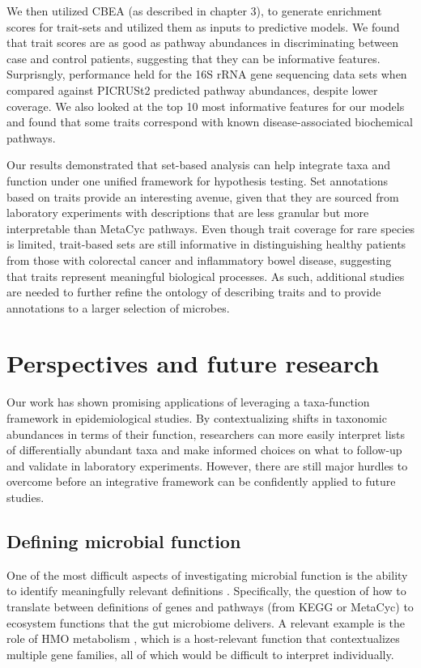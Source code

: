 We then utilized CBEA (as described in chapter 3), to generate enrichment scores for trait-sets and utilized them as inputs to predictive models. We found that trait scores are as good as pathway abundances in discriminating between case and control patients, suggesting that they can be informative features. Surprisngly, performance held for the 16S rRNA gene sequencing data sets when compared against PICRUSt2 predicted pathway abundances, despite lower coverage. We also looked at the top 10 most informative features for our models and found that some traits correspond with known disease-associated biochemical pathways.  

Our results demonstrated that set-based analysis can help integrate taxa and function under one unified framework for hypothesis testing. Set annotations based on traits provide an interesting avenue, given that they are sourced from laboratory experiments with descriptions that are less granular but more interpretable than MetaCyc pathways. Even though trait coverage for rare species is limited, trait-based sets are still informative in distinguishing healthy patients from those with colorectal cancer and inflammatory bowel disease, suggesting that traits represent meaningful biological processes. As such, additional studies are needed to further refine the ontology of describing traits and to provide annotations to a larger selection of microbes.  

\section{Perspectives and future research}

Our work has shown promising applications of leveraging a taxa-function framework in epidemiological studies. By contextualizing shifts in taxonomic abundances in terms of their function, researchers can more easily interpret lists of differentially abundant taxa and make informed choices on what to follow-up and validate in laboratory experiments. However, there are still major hurdles to overcome before an integrative framework can be confidently applied to future studies. 

\subsection{Defining microbial function}

One of the most difficult aspects of investigating microbial function is the ability to identify meaningfully relevant definitions \cite{heintz-buschart2018human, zhang2019advancing, klassen2018defining}. Specifically, the question of how to translate between definitions of genes and pathways (from KEGG or MetaCyc) to ecosystem functions that the gut microbiome delivers. A relevant example is the role of HMO metabolism \cite{vatanen2018human}, which is a host-relevant function that contextualizes multiple gene families, all of which would be difficult to interpret individually.  

